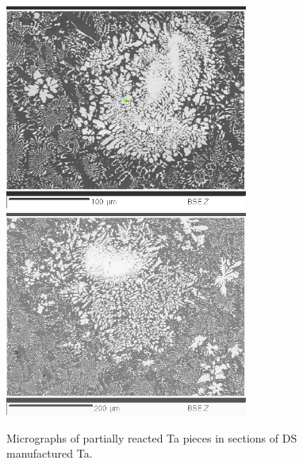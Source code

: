 %
\begin{figure}[htbp]
\begin{center}
\includegraphics[width=8cm]{manual_15_vi}
\includegraphics[width=8cm]{manual_15_vii}
\caption{Micrographs of partially reacted Ta pieces in sections of DS manufactured Ta.}
\label{fig:unmeltedi}
\end{center}
\end{figure}
%


